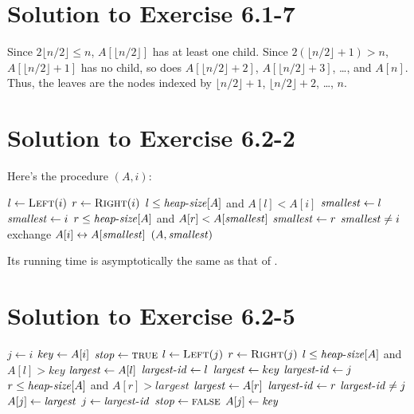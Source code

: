 \documentclass[a4paper, fleqn]{article}
\begin{document}
\section*{Solution to Exercise 6.1-7}

Since $2\lfloor n/2 \rfloor \leq n$, $A[\lfloor n/2 \rfloor]$ has at least one 
child. Since $2(\lfloor n/2 \rfloor + 1) > n$, $A[\lfloor n/2 \rfloor + 1]$ has 
no child, so does $A[\lfloor n/2 \rfloor + 2]$, $A[\lfloor n/2 \rfloor + 3]$, 
\ldots, and $A[n]$. Thus, the leaves are the nodes indexed by $\lfloor n/2 
\rfloor + 1$, $\lfloor n/2 \rfloor + 2$, \ldots, $n$.







\section*{Solution to Exercise 6.2-2}

Here's the procedure $(A,i)$:
\begin{codebox}
\li $l \gets \textnormal{\scshape Left}(i)$
\li $r \gets \textnormal{\scshape Right}(i)$
\li \If $l \leq \id{heap-size}[A]$ and $A[l] < A[i]$
\li     \Then $\id{smallest} \gets l$
\li     \Else $\id{smallest} \gets i$
        \End
\li \If $r \leq \id{heap-size}[A]$ and $A[r] < A[\id{smallest}]$
\li     \Then $\id{smallest} \gets r$
        \End
\li \If $\id{smallest} \neq i$
\li     \Then
            exchange $A[i] \leftrightarrow A[\id{smallest}]$
            $(A,\id{smallest})$
        \End
\end{codebox}
Its running time is asymptotically the same as that of .







\section*{Solution to Exercise 6.2-5}

\begin{codebox}
\li $j \gets i$
\li $\id{key} \gets A[i]$
\li \Repeat
        $\id{stop} \gets \const{true}$
\li     $l \gets \textnormal{\scshape Left}(j)$
\li     $r \gets \textnormal{\scshape Right}(j)$
\li     \If $l \leq \id{heap-size}[A]$ and $A[l] > key$
\li         \Then
                $\id{largest} \gets A[l]$
\li             $\id{largest-id} \gets l$
\li         \Else
                $\id{largest} \gets key$
\li             $\id{largest-id} \gets j$
            \End
\li     \If $r \leq \id{heap-size}[A]$ and $A[r] > largest$
\li         \Then
                $\id{largest} \gets A[r]$
\li             $\id{largest-id} \gets r$
            \End
\li     \If $\id{largest-id } \neq j$
\li         \Then
                $A[j] \gets \id{largest}$
\li             $j \gets \id{largest-id}$
\li             $\id{stop} \gets \const{false}$
            \End
\li \Until {}
\li $A[j] \gets \id{key}$
\end{codebox}
\end{document}
